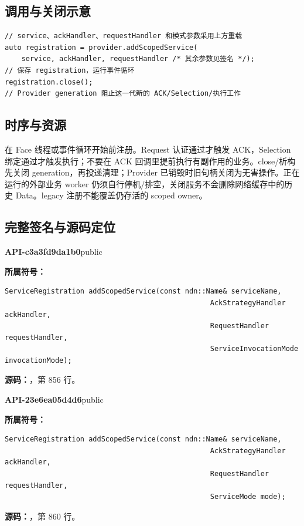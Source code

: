 \subsection{调用与关闭示意}

\begin{Verbatim}[fontsize=\footnotesize,breaklines,breakanywhere]
// service、ackHandler、requestHandler 和模式参数采用上方重载
auto registration = provider.addScopedService(
    service, ackHandler, requestHandler /* 其余参数见签名 */);
// 保存 registration，运行事件循环
registration.close();
// Provider generation 阻止这一代新的 ACK/Selection/执行工作
\end{Verbatim}

\subsection{时序与资源}
在 Face 线程或事件循环开始前注册。Request 认证通过才触发 ACK，Selection 绑定通过才触发执行；不要在 ACK 回调里提前执行有副作用的业务。close/析构先关闭 generation，再投递清理；Provider 已销毁时旧句柄关闭为无害操作。正在运行的外部业务 worker 仍须自行停机/排空，关闭服务不会删除网络缓存中的历史 Data。legacy 注册不能覆盖仍存活的 scoped owner。

\subsection{完整签名与源码定位}

\textbf{API-c3a3fd9da1b0}\quad public\par
\textbf{所属符号：}\par
\begin{Verbatim}[fontsize=\footnotesize,breaklines,breakanywhere]
ServiceRegistration addScopedService(const ndn::Name& serviceName,
                                                 AckStrategyHandler ackHandler,
                                                 RequestHandler requestHandler,
                                                 ServiceInvocationMode invocationMode);
\end{Verbatim}
\textbf{源码：}，第 856 行。\par

\textbf{API-23e6ea05d4d6}\quad public\par
\textbf{所属符号：}\par
\begin{Verbatim}[fontsize=\footnotesize,breaklines,breakanywhere]
ServiceRegistration addScopedService(const ndn::Name& serviceName,
                                                 AckStrategyHandler ackHandler,
                                                 RequestHandler requestHandler,
                                                 ServiceMode mode);
\end{Verbatim}
\textbf{源码：}，第 860 行。\par

